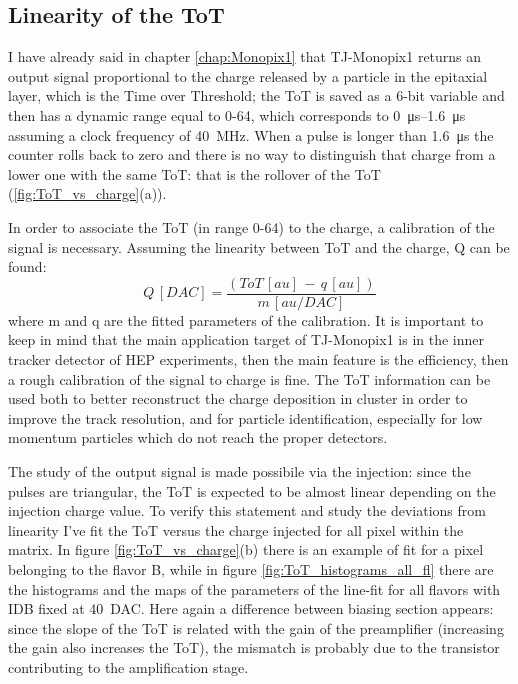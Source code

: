     \subsection{Linearity of the ToT}    
        I have already said in chapter \ref{chap:Monopix1} that TJ-Monopix1 returns an output signal proportional to the charge released by a particle in the epitaxial layer, which is the Time over Threshold; the ToT is saved as a 6-bit variable and then has a dynamic range equal to 0-64, which corresponds to \SIrange{0}{1.6}{\us} assuming a clock frequency of \SI{40}{MHz}.
        When a pulse is longer than \SI{1.6}{\us} the counter rolls back to zero and there is no way to distinguish that charge from a lower one with the same ToT: that is the rollover of the ToT (\ref{fig:ToT_vs_charge}(a)).   

        In order to associate the ToT (in range 0-64) to the charge, a calibration of the signal is necessary. Assuming the linearity between ToT and the charge, Q can be found: 
        \begin{equation}
            Q\, [DAC] = \frac{(ToT\,[au]\, -\, q\,[au])}{m\, [au/DAC]} 
        \end{equation}
        where m and q are the fitted parameters of the calibration.
        It is important to keep in mind that the main application target of TJ-Monopix1 is in the inner tracker detector of HEP experiments, then the main feature is the efficiency, then a rough calibration of the signal to charge is fine. The ToT information can be used both to better reconstruct the charge deposition in cluster in order to improve the track resolution, and for particle identification, especially for low momentum particles which do not reach the proper detectors.
                        
        The study of the output signal is made possibile via the injection: since the pulses are triangular, the ToT is expected to be almost linear depending on the injection charge value.
        To verify this statement and study the deviations from linearity I've fit the ToT versus the charge injected for all pixel within the matrix.
        In figure \ref{fig:ToT_vs_charge}(b) there is an example of fit for a pixel belonging to the flavor B, while in figure \ref{fig:ToT_histograms_all_fl} there are the histograms and the maps of the parameters of the line-fit for all flavors with IDB fixed at \SI{40}{DAC}. Here again a difference between biasing section appears: since the slope of the ToT is related with the gain of the preamplifier (increasing the gain also increases the ToT), the mismatch is probably due to the transistor contributing to the amplification stage.

